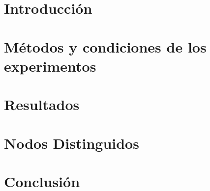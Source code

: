\documentclass{./packages/informe}
\begin{document}
 






\section{Introducción}


\section{Métodos y condiciones de los experimentos}


\section{Resultados}


\section{Nodos Distinguidos}


\section{Conclusión}



% 

% 
% 
\end{document}
